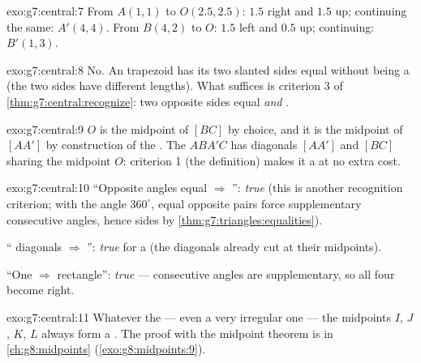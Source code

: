 \begin{solution}{exo:g7:central:7}
From $A(1,1)$ to $O(2.5, 2.5)$: $1.5$ right and $1.5$ up; continuing
the same: $A'(4, 4)$. From $B(4,2)$ to $O$: $1.5$ left and $0.5$ up;
continuing: $B'(1, 3)$.
\end{solution}

\begin{solution}{exo:g7:central:8}
No. An  trapezoid has its two slanted sides equal without
being a  (the two  sides have different
lengths). What suffices is criterion 3 of
\cref{thm:g7:central:recognize}: two opposite sides equal
\emph{and }.
\end{solution}

\begin{solution}{exo:g7:central:9}
$O$ is the midpoint of $[BC]$ by choice, and it is the midpoint of
$[AA']$ by construction of the . The  $ABA'C$
has diagonals $[AA']$ and $[BC]$ sharing the midpoint $O$: criterion
1 (the definition) makes it a  at no extra cost.
\end{solution}

\begin{solution}{exo:g7:central:10}
``Opposite angles equal $\Rightarrow$ '': \emph{true}
(this is another recognition criterion; with the angle 
$360^\circ$, equal opposite pairs force supplementary consecutive
angles, hence  sides by
\cref{thm:g7:triangles:equalities}).

`` diagonals $\Rightarrow$ '': \emph{true} for a
 (the diagonals already cut at their midpoints).

``One  $\Rightarrow$ rectangle'': \emph{true} ---
consecutive angles are supplementary, so all four become right.
\end{solution}

\begin{solution}{exo:g7:central:11}
Whatever the  --- even a very irregular one --- the
midpoints $I$, $J$, $K$, $L$ always form a \emph{}. The
proof with the midpoint theorem is in \cref{ch:g8:midpoints}
(\cref{exo:g8:midpoints:9}).
\end{solution}

